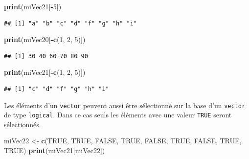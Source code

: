 \documentclass[]{book}
\newenvironment{Shaded}{\begin{snugshade}}{\end{snugshade}}
\newcommand{\DecValTok}[1]{\textcolor[rgb]{0.00,0.00,0.81}{#1}}
\newcommand{\KeywordTok}[1]{\textcolor[rgb]{0.13,0.29,0.53}{\textbf{#1}}}
\newcommand{\NormalTok}[1]{#1}
\newcommand{\OperatorTok}[1]{\textcolor[rgb]{0.81,0.36,0.00}{\textbf{#1}}}
\newcommand{\OtherTok}[1]{\textcolor[rgb]{0.56,0.35,0.01}{#1}}
\newcommand{\StringTok}[1]{\textcolor[rgb]{0.31,0.60,0.02}{#1}}
\begin{document}
\begin{Shaded}
\begin{Highlighting}[]
\KeywordTok{print}\NormalTok{(miVec21[}\OperatorTok{-}\DecValTok{5}\NormalTok{])}
\end{Highlighting}
\end{Shaded}

\begin{verbatim}
## [1] "a" "b" "c" "d" "f" "g" "h" "i"
\end{verbatim}

\begin{Shaded}
\begin{Highlighting}[]
\KeywordTok{print}\NormalTok{(miVec20[}\OperatorTok{-}\KeywordTok{c}\NormalTok{(}\DecValTok{1}\NormalTok{, }\DecValTok{2}\NormalTok{, }\DecValTok{5}\NormalTok{)])}
\end{Highlighting}
\end{Shaded}

\begin{verbatim}
## [1] 30 40 60 70 80 90
\end{verbatim}

\begin{Shaded}
\begin{Highlighting}[]
\KeywordTok{print}\NormalTok{(miVec21[}\OperatorTok{-}\KeywordTok{c}\NormalTok{(}\DecValTok{1}\NormalTok{, }\DecValTok{2}\NormalTok{, }\DecValTok{5}\NormalTok{)])}
\end{Highlighting}
\end{Shaded}

\begin{verbatim}
## [1] "c" "d" "f" "g" "h" "i"
\end{verbatim}

Les éléments d'un \texttt{vector} peuvent aussi être sélectionné sur la base d'un \texttt{vector} de type \texttt{logical}. Dans ce cas seuls les éléments avec une valeur \texttt{TRUE} seront sélectionnés.

\begin{Shaded}
\begin{Highlighting}[]
\NormalTok{miVec22 <-}\StringTok{ }\KeywordTok{c}\NormalTok{(}\OtherTok{TRUE}\NormalTok{, }\OtherTok{TRUE}\NormalTok{, }\OtherTok{FALSE}\NormalTok{, }\OtherTok{TRUE}\NormalTok{, }\OtherTok{FALSE}\NormalTok{, }\OtherTok{TRUE}\NormalTok{, }\OtherTok{FALSE}\NormalTok{, }\OtherTok{TRUE}\NormalTok{, }\OtherTok{TRUE}\NormalTok{)}
\KeywordTok{print}\NormalTok{(miVec21[miVec22])}
\end{Highlighting}
\end{Shaded}
\end{document}
